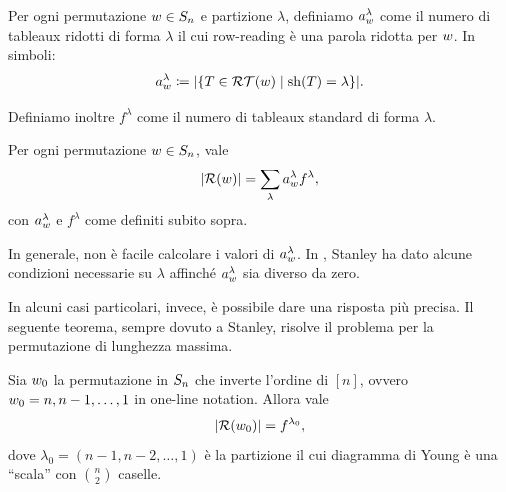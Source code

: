 \begin{definition}
    \label{def:a_w_lambda}
    Per ogni permutazione $w \in S_n$ e partizione 
    $\lambda$, 
    definiamo $a_w^\lambda$ come il numero di tableaux ridotti di forma $\lambda$
    il cui row-reading \`e una parola ridotta per $w$.
    In simboli:
    \[
        a_w^\lambda \coloneq \lvert \left\{ 
            T \in \operatorname{\mathcal{RT}}(w) \mid \operatorname{sh}(T) = \lambda
        \right\} \rvert .
    \]

    Definiamo inoltre $f^\lambda$ come il numero di tableaux standard di forma $\lambda$.
\end{definition}

\begin{corollary}
    Per ogni permutazione $w \in S_n$, vale
    \begin{equation}
        \label{eq:number_reduced_words}
        \lvert \operatorname{\mathcal{R}}(w) \rvert = \sum_{\lambda} a_w^\lambda f^\lambda,
    \end{equation}
    con $a_w^\lambda$ e $f^\lambda$ come definiti subito sopra.
\end{corollary}

In generale, non \`e facile calcolare i valori di $a_w^\lambda$.
In \cite[Section~4]{stanley-84}, Stanley ha dato alcune condizioni necessarie su $\lambda$ 
affinch\'e $a_w^\lambda$ sia diverso da zero.

In alcuni casi particolari, invece, \`e possibile dare una risposta pi\`u precisa.
Il seguente teorema, sempre dovuto a Stanley, risolve il problema per la 
permutazione di lunghezza massima.

\begin{theorem}
    {\cite[Theorem~6.26]{edelman-greene-87}}
    \label{thm:stanley_og}
    Sia $w_0$ la permutazione in $S_n$ che inverte l'ordine di $[n]$, ovvero
    $w_0 = n, n-1, \dots , 1 $ in one-line notation.
    Allora vale
    \[
        \lvert \operatorname{\mathcal{R}}(w_0) \rvert = f^{\lambda_0},
    \]
    dove $\lambda_0 = (n-1, n-2, \dots, 1)$ \`e la partizione il cui diagramma di
    Young \`e una ``scala'' con $\binom{n}{2}$ caselle.
\end{theorem}

